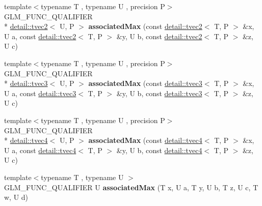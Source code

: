 \begin{DoxyCompactItemize}
\item 
\hypertarget{namespaceglm_a1bff89aba9a245cf4976d6b7fb66ddd8}{{\footnotesize template$<$typename T , typename U , precision P$>$ }\\G\-L\-M\-\_\-\-F\-U\-N\-C\-\_\-\-Q\-U\-A\-L\-I\-F\-I\-E\-R \\*
\hyperlink{structglm_1_1detail_1_1tvec2}{detail\-::tvec2}$<$ U, P $>$ {\bfseries associated\-Max} (const \hyperlink{structglm_1_1detail_1_1tvec2}{detail\-::tvec2}$<$ T, P $>$ \&x, U a, const \hyperlink{structglm_1_1detail_1_1tvec2}{detail\-::tvec2}$<$ T, P $>$ \&y, U b, const \hyperlink{structglm_1_1detail_1_1tvec2}{detail\-::tvec2}$<$ T, P $>$ \&z, U c)}\label{namespaceglm_a1bff89aba9a245cf4976d6b7fb66ddd8}

\item 
\hypertarget{namespaceglm_a95d56ed7aac4ce11096a2dd02b1ee085}{{\footnotesize template$<$typename T , typename U , precision P$>$ }\\G\-L\-M\-\_\-\-F\-U\-N\-C\-\_\-\-Q\-U\-A\-L\-I\-F\-I\-E\-R \\*
\hyperlink{structglm_1_1detail_1_1tvec3}{detail\-::tvec3}$<$ U, P $>$ {\bfseries associated\-Max} (const \hyperlink{structglm_1_1detail_1_1tvec3}{detail\-::tvec3}$<$ T, P $>$ \&x, U a, const \hyperlink{structglm_1_1detail_1_1tvec3}{detail\-::tvec3}$<$ T, P $>$ \&y, U b, const \hyperlink{structglm_1_1detail_1_1tvec3}{detail\-::tvec3}$<$ T, P $>$ \&z, U c)}\label{namespaceglm_a95d56ed7aac4ce11096a2dd02b1ee085}

\item 
\hypertarget{namespaceglm_a7ccec1a3ebac248a4fc02c0cd62e455a}{{\footnotesize template$<$typename T , typename U , precision P$>$ }\\G\-L\-M\-\_\-\-F\-U\-N\-C\-\_\-\-Q\-U\-A\-L\-I\-F\-I\-E\-R \\*
\hyperlink{structglm_1_1detail_1_1tvec4}{detail\-::tvec4}$<$ U, P $>$ {\bfseries associated\-Max} (const \hyperlink{structglm_1_1detail_1_1tvec4}{detail\-::tvec4}$<$ T, P $>$ \&x, U a, const \hyperlink{structglm_1_1detail_1_1tvec4}{detail\-::tvec4}$<$ T, P $>$ \&y, U b, const \hyperlink{structglm_1_1detail_1_1tvec4}{detail\-::tvec4}$<$ T, P $>$ \&z, U c)}\label{namespaceglm_a7ccec1a3ebac248a4fc02c0cd62e455a}

\item 
\hypertarget{namespaceglm_a7ec2c4ed91faef109efef1465ca65ca4}{{\footnotesize template$<$typename T , typename U $>$ }\\G\-L\-M\-\_\-\-F\-U\-N\-C\-\_\-\-Q\-U\-A\-L\-I\-F\-I\-E\-R U {\bfseries associated\-Max} (T x, U a, T y, U b, T z, U c, T w, U d)}\label{namespaceglm_a7ec2c4ed91faef109efef1465ca65ca4}


\end{DoxyCompactItemize}

